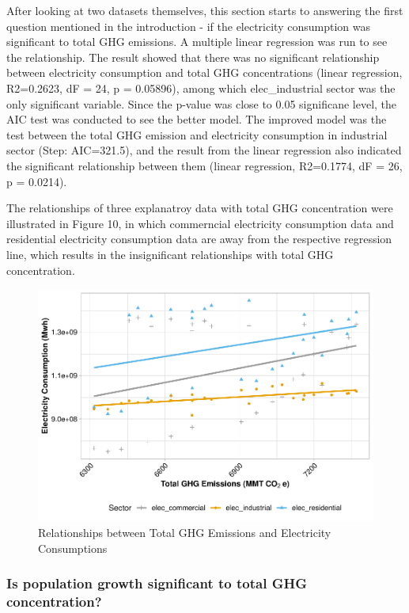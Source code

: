 \documentclass[12pt,]{article}
\begin{document}
After looking at two datasets themselves, this section starts to
answering the first question mentioned in the introduction - if the
electricity consumption was significant to total GHG emissions. A
multiple linear regression was run to see the relationship. The result
showed that there was no significant relationship between electricity
consumption and total GHG concentrations (linear regression, R2=0.2623,
dF = 24, p = 0.05896), among which elec\_industrial sector was the only
significant variable. Since the p-value was close to 0.05 significane
level, the AIC test was conducted to see the better model. The improved
model was the test between the total GHG emission and electricity
consumption in industrial sector (Step: AIC=321.5), and the result from
the linear regression also indicated the significant relationship
between them (linear regression, R2=0.1774, dF = 26, p = 0.0214).

The relationships of three explanatroy data with total GHG concentration
were illustrated in Figure 10, in which commerncial electricity
consumption data and residential electricity consumption data are away
from the respective regression line, which results in the insignificant
relationships with total GHG concentration.

\begin{figure}
\centering
\includegraphics{Project_Code_files/figure-latex/unnamed-chunk-27-1.pdf}
\caption{Relationships between Total GHG Emissions and Electricity
Consumptions}
\end{figure}

\newpage

\subsubsection{Is population growth significant to total GHG
concentration?}\label{is-population-growth-significant-to-total-ghg-concentration}
\end{document}
